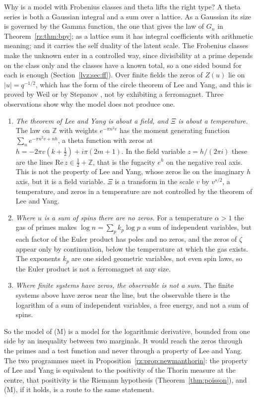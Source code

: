 Why is a model with Frobenius classes and theta lifts the right type? A theta series is both a Gaussian integral and a sum over a lattice. As a Gaussian its size is governed by the Gamma function, the one that gives the law of $G_n$ in Theorem~\ref{rz:thm:bpy}; as a lattice sum it has integral coefficients with arithmetic meaning; and it carries the self duality of the latent scale. The Frobenius classes make the unknown enter in a controlled way, since divisibility at a prime depends on the class only and the classes have a known total, so a one sided bound for each is enough (Section~\ref{lvz:sec:ff}). Over finite fields the zeros of $Z(u)$ lie on $|u|=q^{-1/2}$, which has the form of the circle theorem of Lee and Yang, and this is proved by Weil \cite{Weil49} or by Stepanov \cite{BombieriStepanov}, not by exhibiting a ferromagnet. Three observations show why the model does not produce one.
\begin{enumerate}
\item \emph{The theorem of Lee and Yang is about a field, and $\Xi$ is about a temperature.} The law on $\mathbb Z$ with weights $e^{-\pi n^2v}$ has the moment generating function $\sum_ne^{-\pi n^2v+nh}$, a theta function with zeros at $h=-2\pi v(k+\frac12)+i\pi(2m+1)$. In the field variable $z=h/(2\pi i)$ these are the lines $\mathrm{Re}\,z\in\frac12+\mathbb Z$, that is the fugacity $e^h$ on the negative real axis. This is not the property of Lee and Yang, whose zeros lie on the imaginary $h$ axis, but it is a field variable. $\Xi$ is a transform in the scale $v$ by $v^{s/2}$, a temperature, and zeros in a temperature are not controlled by the theorem of Lee and Yang.
\item \emph{Where $u$ is a sum of spins there are no zeros.} For a temperature $\alpha>1$ the gas of primes makes $\log n=\sum_pk_p\log p$ a sum of independent variables, but each factor of the Euler product has poles and no zeros, and the zeros of $\zeta$ appear only by continuation, below the temperature at which the gas exists. The exponents $k_p$ are one sided geometric variables, not even spin laws, so the Euler product is not a ferromagnet at any size.
\item \emph{Where finite systems have zeros, the observable is not a sum.} The finite systems above have zeros near the line, but the observable there is the logarithm of a sum of independent variables, a free energy, and not a sum of spins.
\end{enumerate}
So the model of (M) is a model for the logarithmic derivative, bounded from one side by an inequality between two marginals. It would reach the zeros through the primes and a test function and never through a property of Lee and Yang. The two programmes meet in Proposition~\ref{rz:prop:newmanthorin}: the property of Lee and Yang is equivalent to the positivity of the Thorin measure at the centre, that positivity is the Riemann hypothesis (Theorem~\ref{thm:poisson}), and (M), if it holds, is a route to the same statement.

